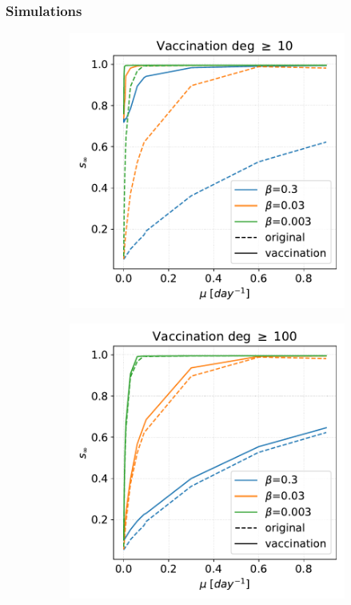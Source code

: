 \documentclass[a4paper,11pt, twocolumn]{article}
\begin{document}
\subsubsection*{Simulations}
\begin{figure}[t!]
\begin{subfigure}[t]{0.32\textwidth}
\centering
\includegraphics[scale=0.30]{./Figure/SIR/vax_deg_10.pdf}
\caption{}
\end{subfigure}
\begin{subfigure}[t]{0.32\textwidth}
\centering
\includegraphics[scale=0.30]{./Figure/SIR/vax_deg_100.pdf}

\end{subfigure}
\end{figure}
\end{document}
